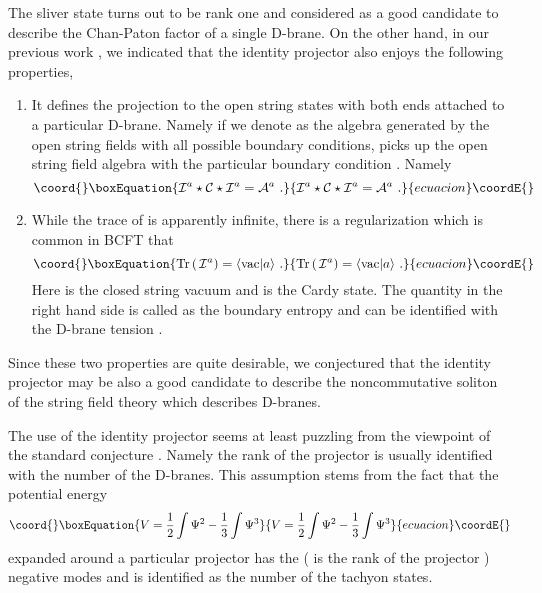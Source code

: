 \documentclass[a4paper,12pt]{article}
\begin{document}
The sliver state turns out to be
rank one and  considered as
a good candidate to describe the Chan-Paton factor of
a single D-brane.
On the other hand, in our previous work \cite{r-Matsuo2}, 
we indicated that the identity projector also enjoys
the following properties,
\begin{enumerate}
 \item It defines the projection to the open string states with
       both ends attached to a particular D-brane.  Namely if we
       denote \myHighlight{$\cC$}\coordHE{} as the algebra generated by the 
       open string fields with all possible boundary conditions,
       \coordHE{} picks up the open string field algebra
       \coordHE{} with the particular boundary condition \coordHE{}.  Namely
\begin{equation}\coord{}\boxEquation{\label{e-identity_projector}
 \cI^a\star \cC \star\cI^a = \cA^a\,\,.
}{\cI^a\star \cC \star\cI^a = \cA^a\,\,.
}{ecuacion}\coordE{}\end{equation}
 \item While the trace of \coordHE{} is apparently infinite, there is
       a regularization which is common in BCFT that
\begin{equation}\coord{}\boxEquation{
 \mbox{Tr}\,(\,\cI^a) = \langle\mbox{vac} |a\rangle\,\,.
}{
 \mbox{Tr}\,(\,\cI^a) = \langle\mbox{vac} |a\rangle\,\,.
}{ecuacion}\coordE{}\end{equation}
Here \coordHE{} is the closed string vacuum
and \coordHE{} is the Cardy state.  The quantity 
in the right hand side is called as the boundary entropy
and can be identified with the D-brane tension \cite{r-HKMS}.
\end{enumerate}
Since these two properties are quite desirable, we
conjectured that the identity projector 
may be also a good candidate to 
describe the noncommutative soliton of the string 
field theory which describes D-branes.  

The use of the identity projector seems at least
puzzling from the viewpoint of
the standard conjecture \cite{r-RSZ2, r-RSZ3, r-GT1, r-RSZ4, r-GT2}.
Namely the rank of the projector is usually 
identified with the number of the D-branes.
This assumption stems from the fact that the potential energy 
\begin{equation}\coord{}\boxEquation{\label{e-potential}
 V=\frac{1}{2}\int \Psi^2 -\frac{1}{3}\int \Psi^3
}{V=\frac{1}{2}\int \Psi^2 -\frac{1}{3}\int \Psi^3
}{ecuacion}\coordE{}\end{equation}
expanded around a particular projector \coordHE{}
has the \coordHE{} (\coordHE{} is the rank of the projector \coordHE{}) 
negative modes and is identified as the number of
the tachyon states.  
\end{document}
